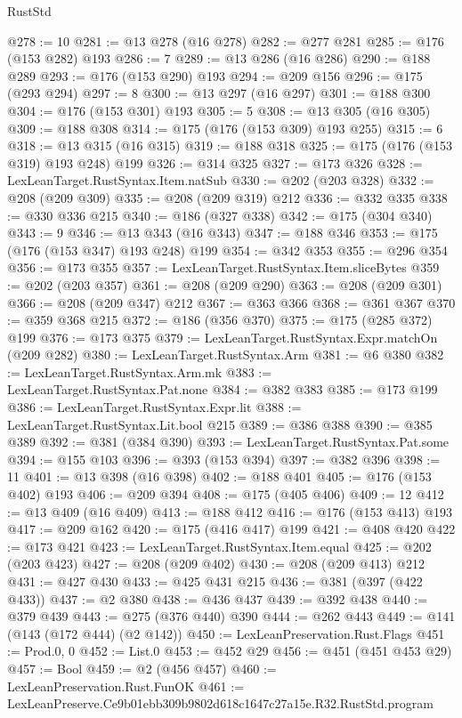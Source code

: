 \begin{lexlean}{RustStd}
\begin{coremodule}
@278 := 10
@281 := @13 @278 (@16 @278)
@282 := @277 @281
@285 := @176 (@153 @282) @193
@286 := 7
@289 := @13 @286 (@16 @286)
@290 := @188 @289
@293 := @176 (@153 @290) @193
@294 := @209 @156
@296 := @175 (@293 @294)
@297 := 8
@300 := @13 @297 (@16 @297)
@301 := @188 @300
@304 := @176 (@153 @301) @193
@305 := 5
@308 := @13 @305 (@16 @305)
@309 := @188 @308
@314 := @175 (@176 (@153 @309) @193 @255)
@315 := 6
@318 := @13 @315 (@16 @315)
@319 := @188 @318
@325 := @175 (@176 (@153 @319) @193 @248) @199
@326 := @314 @325
@327 := @173 @326
@328 := LexLeanTarget.RustSyntax.Item.natSub
@330 := @202 (@203 @328)
@332 := @208 (@209 @309)
@335 := @208 (@209 @319) @212
@336 := @332 @335
@338 := @330 @336 @215
@340 := @186 (@327 @338)
@342 := @175 (@304 @340)
@343 := 9
@346 := @13 @343 (@16 @343)
@347 := @188 @346
@353 := @175 (@176 (@153 @347) @193 @248) @199
@354 := @342 @353
@355 := @296 @354
@356 := @173 @355
@357 := LexLeanTarget.RustSyntax.Item.sliceBytes
@359 := @202 (@203 @357)
@361 := @208 (@209 @290)
@363 := @208 (@209 @301)
@366 := @208 (@209 @347) @212
@367 := @363 @366
@368 := @361 @367
@370 := @359 @368 @215
@372 := @186 (@356 @370)
@375 := @175 (@285 @372) @199
@376 := @173 @375
@379 := LexLeanTarget.RustSyntax.Expr.matchOn (@209 @282)
@380 := LexLeanTarget.RustSyntax.Arm
@381 := @6 @380
@382 := LexLeanTarget.RustSyntax.Arm.mk
@383 := LexLeanTarget.RustSyntax.Pat.none
@384 := @382 @383
@385 := @173 @199
@386 := LexLeanTarget.RustSyntax.Expr.lit
@388 := LexLeanTarget.RustSyntax.Lit.bool @215
@389 := @386 @388
@390 := @385 @389
@392 := @381 (@384 @390)
@393 := LexLeanTarget.RustSyntax.Pat.some
@394 := @155 @103
@396 := @393 (@153 @394)
@397 := @382 @396
@398 := 11
@401 := @13 @398 (@16 @398)
@402 := @188 @401
@405 := @176 (@153 @402) @193
@406 := @209 @394
@408 := @175 (@405 @406)
@409 := 12
@412 := @13 @409 (@16 @409)
@413 := @188 @412
@416 := @176 (@153 @413) @193
@417 := @209 @162
@420 := @175 (@416 @417) @199
@421 := @408 @420
@422 := @173 @421
@423 := LexLeanTarget.RustSyntax.Item.equal
@425 := @202 (@203 @423)
@427 := @208 (@209 @402)
@430 := @208 (@209 @413) @212
@431 := @427 @430
@433 := @425 @431 @215
@436 := @381 (@397 (@422 @433))
@437 := @2 @380
@438 := @436 @437
@439 := @392 @438
@440 := @379 @439
@443 := @275 (@376 @440) @390
@444 := @262 @443
@449 := @141 (@143 (@172 @444) (@2 @142))
@450 := LexLeanPreservation.Rust.Flags
@451 := Prod.{0, 0}
@452 := List.{0}
@453 := @452 @29
@456 := @451 (@451 @453 @29)
@457 := Bool
@459 := @2 (@456 @457)
@460 := LexLeanPreservation.Rust.FunOK
@461 := LexLeanPreserve.Ce9b01ebb309b9802d618c1647c27a15e.R32.RustStd.program

\end{coremodule}
\end{lexlean}
